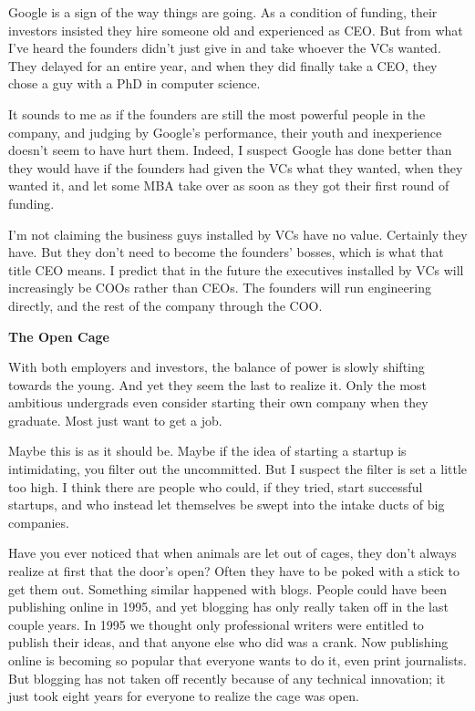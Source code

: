 Google is a sign of the way things are going. As a condition of funding,
their investors insisted they hire someone old and experienced as CEO.
But from what I've heard the founders didn't just give in and take
whoever the VCs wanted. They delayed for an entire year, and when they
did finally take a CEO, they chose a guy with a PhD in computer science.

It sounds to me as if the founders are still the most powerful people in
the company, and judging by Google's performance, their youth and
inexperience doesn't seem to have hurt them. Indeed, I suspect Google
has done better than they would have if the founders had given the VCs
what they wanted, when they wanted it, and let some MBA take over as
soon as they got their first round of funding.

I'm not claiming the business guys installed by VCs have no value.
Certainly they have. But they don't need to become the founders' bosses,
which is what that title CEO means. I predict that in the future the
executives installed by VCs will increasingly be COOs rather than CEOs.
The founders will run engineering directly, and the rest of the company
through the COO.

\textbf{The Open Cage}

With both employers and investors, the balance of power is slowly
shifting towards the young. And yet they seem the last to realize it.
Only the most ambitious undergrads even consider starting their own
company when they graduate. Most just want to get a job.

Maybe this is as it should be. Maybe if the idea of starting a startup
is intimidating, you filter out the uncommitted. But I suspect the
filter is set a little too high. I think there are people who could, if
they tried, start successful startups, and who instead let themselves be
swept into the intake ducts of big companies.

Have you ever noticed that when animals are let out of cages, they don't
always realize at first that the door's open? Often they have to be
poked with a stick to get them out. Something similar happened with
blogs. People could have been publishing online in 1995, and yet
blogging has only really taken off in the last couple years. In 1995 we
thought only professional writers were entitled to publish their ideas,
and that anyone else who did was a crank. Now publishing online is
becoming so popular that everyone wants to do it, even print
journalists. But blogging has not taken off recently because of any
technical innovation; it just took eight years for everyone to realize
the cage was open.


